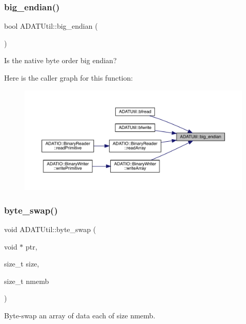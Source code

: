 \subsubsection{\texorpdfstring{big\_endian()}{big\_endian()}}
{\footnotesize\ttfamily bool A\+D\+A\+T\+Util\+::big\+\_\+endian (\begin{DoxyParamCaption}{ }\end{DoxyParamCaption})}



Is the native byte order big endian? 

Here is the caller graph for this function\+:\nopagebreak
\begin{figure}[H]
\begin{center}
\leavevmode
\includegraphics[width=350pt]{de/d19/namespaceADATUtil_a7f9f0561f3ffcb562067ebedbade089f_icgraph}
\end{center}
\end{figure}
\mbox{\label{namespaceADATUtil_af522573b90be52b1e09342dd11e23199}} 
\subsubsection{\texorpdfstring{byte\_swap()}{byte\_swap()}}
{\footnotesize\ttfamily void A\+D\+A\+T\+Util\+::byte\+\_\+swap (\begin{DoxyParamCaption}\item[{void $\ast$}]{ptr,  }\item[{size\+\_\+t}]{size,  }\item[{size\+\_\+t}]{nmemb }\end{DoxyParamCaption})}



Byte-\/swap an array of data each of size nmemb. 

